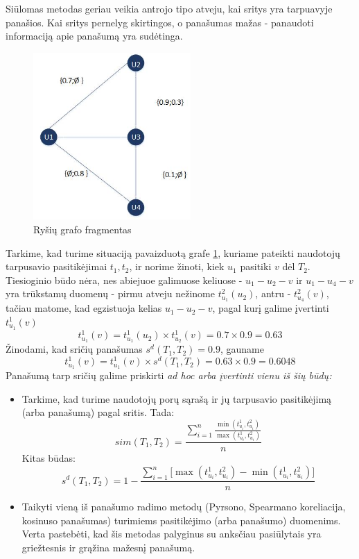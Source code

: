 \documentclass{VUMIFInfMagistrinis}
\begin{document}
Siūlomas metodas geriau veikia antrojo tipo atveju, kai sritys yra tarpuavyje panašios. Kai sritys pernelyg skirtingos, o panašumas mažas - panaudoti informaciją apie panašumą yra sudėtinga.
\begin{figure}[ht!]
	\centering
	\includegraphics[width=60mm]{multiarea.jpg}
	\caption{Ryšių grafo fragmentas} \label{multiarea}
\end{figure}
Tarkime, kad turime situaciją pavaizduotą grafe \ref{multiarea}, kuriame pateikti naudotojų tarpusavio pasitikėjimai ${t_1, t_2}$, ir norime žinoti, kiek $u_1$ pasitiki $v$ dėl $T_2$. Tiesioginio būdo nėra, nes abiejuoe galimuose keliuose - $u_1 - u_2 - v$ ir $u_1 - u_4 - v$ yra trūkstamų duomenų - pirmu atveju nežinome $t_{u_1}^2(u_2)$, antru - $t_{u_4}^2(v)$, tačiau matome, kad egzistuoja kelias $u_1 - u_2 - v$, pagal kurį galime įvertinti $t_{u_1}^1(v)$
\begin{displaymath}
t_{u_1}^1(v)=t_{u_1}^1(u_2) \times t_{u_2}^1(v) = 0.7 \times 0.9 = 0.63
\end{displaymath}
Žinodami, kad sričių panašumas $s^d(T_1, T_2) = 0.9$, gauname
\begin{displaymath}
t_{u_1}^1(v)=t_{u_1}^1(v) \times s^d(T_1, T_2) = 0.63 \times 0.9 = 0.6048
\end{displaymath}
Panašumą tarp sričių galime priskirti \it{ad hoc} \normalfont arba įvertinti vienu iš šių būdų:
\begin{itemize}
	\item Tarkime, kad turime naudotojų porų sąrašą ir jų tarpusavio pasitikėjimą (arba panašumą) pagal sritis. Tada:
	\begin{displaymath}\label{eq:areasim}
	sim(T_1, T_2) = \frac{\sum \limits_{i=1}^n \frac{\min(t_{u_i}^1, t_{u_i}^2)}{\max(t_{u_i}^1, t_{u_i}^2)}}{n}
	\end{displaymath}
	\indent
	Kitas būdas:
	\begin{displaymath}\label{eq:areasim}
	s^d(T_1, T_2) = 1-\frac{\sum \limits_{i=1}^n \big[\max(t_{u_i}^1, t_{u_i}^2)- \min(t_{u_i}^1, t_{u_i}^2)\big]}{n}
	\end{displaymath}
	\item Taikyti vieną iš panašumo radimo metodų (Pyrsono, Spearmano koreliacija, kosinuso panašumas) turimiems pasitikėjimo (arba panašumo) duomenims. Verta pastebėti, kad šis metodas palyginus su anksčiau pasiūlytais yra griežtesnis ir grąžina mažesnį panašumą.
\end{itemize} 
\end{document}
